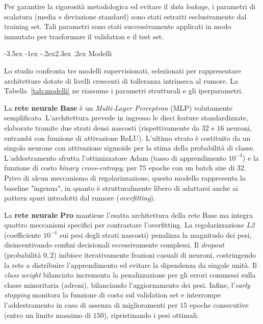 \documentclass[12pt,a4paper]{article}
\makeatletter
\renewcommand\section{\@startsection{section}{1}{\z@}%
  {-3.5ex \@plus -1ex \@minus -.2ex}{2.3ex \@plus.2ex}%
  {\normalfont\Large\bfseries}}
\makeatother
\begin{document}
Per garantire la rigorosità metodologica ed evitare il \textit{data leakage}, 
i parametri di scalatura (media e deviazione standard) sono stati estratti 
esclusivamente dal training set. Tali parametri sono stati successivamente 
applicati in modo immutato per trasformare il validation e il test set.

\section{Modelli}\label{sec:modelli}

Lo studio confronta tre modelli supervisionati, selezionati per rappresentare 
architetture dotate di livelli crescenti di tolleranza intrinseca al rumore. La 
Tabella~\ref{tab:modelli} ne riassume i parametri strutturali e gli iperparametri.

La \textbf{rete neurale Base} è un \textit{Multi-Layer Perceptron} (MLP) 
volutamente semplificato. L'architettura prevede in ingresso le dieci feature 
standardizzate, elaborate tramite due strati densi nascosti (rispettivamente da 
$32$ e $16$ neuroni, entrambi con funzione di attivazione ReLU). L'ultimo strato 
è costituito da un singolo neurone con attivazione sigmoide per la stima della 
probabilità di classe. L'addestramento sfrutta l'ottimizzatore Adam (tasso di 
apprendimento $10^{-3}$) e la funzione di costo \textit{binary cross-entropy}, 
per $75$ epoche con un batch size di $32$. Privo di alcun meccanismo di 
regolarizzazione, questo modello rappresenta la baseline "ingenua", in quanto è 
strutturalmente libero di adattarsi anche ai pattern spuri introdotti dal 
rumore (\textit{overfitting}).

La \textbf{rete neurale Pro} mantiene l'esatta architettura della rete Base ma 
integra quattro meccanismi specifici per contrastare l'overfitting. La 
regolarizzazione \emph{L2} (coefficiente $10^{-4}$ sui pesi degli strati nascosti) 
penalizza la magnitudo dei pesi, disincentivando confini decisionali 
eccessivamente complessi. Il \emph{dropout} (probabilità $0{,}2$) inibisce 
iterativamente frazioni casuali di neuroni, costringendo la rete a distribuire 
l'apprendimento ed evitare la dipendenza da singole unità. Il 
\emph{class weight} bilanciato incrementa la penalizzazione per gli errori 
commessi sulla classe minoritaria (adroni), bilanciando l'aggiornamento dei 
pesi. Infine, l'\emph{early stopping} monitora la funzione di costo sul 
validation set e interrompe l'addestramento in caso di assenza di miglioramenti 
per $15$ epoche consecutive (entro un limite massimo di $150$), ripristinando i 
pesi ottimali.
\end{document}
